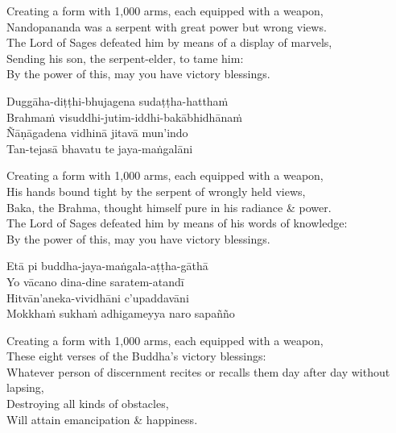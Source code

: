 \begin{english-verses}
  Creating a form with 1,000 arms, each equipped with a weapon,\\
  Nandopananda was a serpent with great power but wrong views.\\
  The Lord of Sages defeated him by means of a display of marvels,\\
  Sending his son, the serpent-elder, to tame him:\\
  By the power of this, may you have victory blessings.
\end{english-verses}

Duggāha-diṭṭhi-bhujagena sudaṭṭha-hatthaṁ\\
Brahmaṁ visuddhi-jutim-iddhi-bakābhidhānaṁ\\
Ñāṇāgadena vidhinā jitavā mun'indo\\
Tan-tejasā bhavatu te jaya-maṅgalāni

\begin{english-verses}
  Creating a form with 1,000 arms, each equipped with a weapon,\\
  His hands bound tight by the serpent of wrongly held views,\\
  Baka, the Brahma, thought himself pure in his radiance \& power.\\
  The Lord of Sages defeated him by means of his words of knowledge:\\
  By the power of this, may you have victory blessings.
\end{english-verses}

Etā pi buddha-jaya-maṅgala-aṭṭha-gāthā\\
Yo vācano dina-dine saratem-atandī\\
Hitvān'aneka-vividhāni c'upaddavāni\\
Mokkhaṁ sukhaṁ adhigameyya naro sapañño

\begin{english-verses}
  Creating a form with 1,000 arms, each equipped with a weapon,\\
  These eight verses of the Buddha's victory blessings:\\
  Whatever person of discernment recites or recalls them day after day without lapsing,\\
  Destroying all kinds of obstacles,\\
  Will attain emancipation \& happiness.
\end{english-verses}

\suttaRef{[Trad]}

